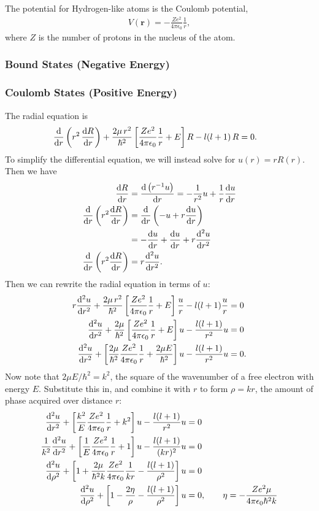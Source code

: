 \documentclass[12pt]{article}
\newcommand{\R}{\mathbf{r}}
\numberwithin{equation}{section}
\begin{document}
The potential for Hydrogen-like atoms is the Coulomb potential,
\begin{align*}
V(\R) = - \frac{Z e^2}{4 \pi \epsilon_0} \frac{1}{r},
\end{align*}
where $Z$ is the number of protons in the nucleus of the atom.

\subsubsection{Bound States (Negative Energy)}

\subsubsection{Coulomb States (Positive Energy)}

The radial equation is
\begin{align*}
\dv{r} \left(r^2 \, \dv{R}{r}\right) + \frac{2\mu \, r^2}{\hbar^2} \left[\frac{Z e^2}{4 \pi \epsilon_0} \frac{1}{r} + E\right] R - l(l+1) \, R &= 0.
\end{align*}
To simplify the differential equation, we will instead solve for $u(r) = r R(r)$. Then we have
\begin{align*}
\dv{R}{r} &= \dv{\left(r^{-1} u\right)}{r} = -\frac{1}{r^2} u + \frac{1}{r} \dv{u}{r} \\
\dv{r} \left(r^2 \dv{R}{r}\right) &= \dv{r} \left(-u + r \dv{u}{r}\right) \\
&= - \dv{u}{r} + \dv{u}{r} + r \dv[2]{u}{r} \\
\dv{r} \left(r^2 \dv{R}{r}\right) &= r \dv[2]{u}{r}.
\end{align*}
Then we can rewrite the radial equation in terms of $u$:
\begin{align*}
r \dv[2]{u}{r} + \frac{2\mu \, r^2}{\hbar^2} \left[\frac{Z e^2}{4 \pi \epsilon_0} \frac{1}{r} + E\right] \frac{u}{r} - l(l+1) \frac{u}{r} &= 0 \\
\dv[2]{u}{r} + \frac{2\mu}{\hbar^2} \left[\frac{Z e^2}{4 \pi \epsilon_0} \frac{1}{r} + E\right] u - \frac{l(l+1)}{r^2} u &= 0 \\
\dv[2]{u}{r} + \left[\frac{2\mu}{\hbar^2} \frac{Z e^2}{4 \pi \epsilon_0} \frac{1}{r} + \frac{2\mu E}{\hbar^2}\right] u - \frac{l(l+1)}{r^2} u &= 0.
\end{align*}
Now note that $2 \mu E / \hbar^2 = k^2$, the square of the wavenumber of a free electron with energy $E$. Substitute this in, and combine it with $r$ to form $\rho = kr$, the amount of phase acquired over distance $r$:
\begin{align*}
\dv[2]{u}{r} + \left[\frac{k^2}{E} \frac{Z e^2}{4 \pi \epsilon_0} \frac{1}{r} + k^2 \right] u - \frac{l(l+1)}{r^2} u &= 0 \\
\frac{1}{k^2}\dv[2]{u}{r} + \left[\frac{1}{E} \frac{Z e^2}{4 \pi \epsilon_0} \frac{1}{r} + 1 \right] u - \frac{l(l+1)}{(kr)^2} u &= 0 \\
\dv[2]{u}{\rho} + \left[1 + \frac{2\mu}{\hbar^2 k} \frac{Z e^2}{4 \pi \epsilon_0} \frac{1}{kr} - \frac{l(l+1)}{\rho^2}\right] u  &= 0 \\
\dv[2]{u}{\rho} + \left[1 - \frac{2\eta}{\rho} - \frac{l(l+1)}{\rho^2}\right] u  &= 0, \qquad \eta =  -\frac{Z e^2 \mu}{4 \pi \epsilon_0 \hbar^2 k}
\end{align*}
\end{document}
